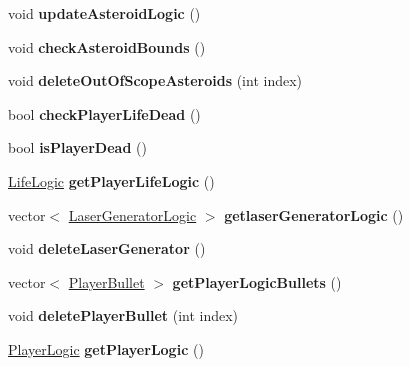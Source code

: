 \begin{DoxyCompactItemize}
void {\bfseries update\+Asteroid\+Logic} ()
\item 
\mbox{\label{class_game_logic_a35dcb163c584e620b876def784cbd7a4}} 
void {\bfseries check\+Asteroid\+Bounds} ()
\item 
\mbox{\label{class_game_logic_ae2bb92c22bea679a7467c592f253263b}} 
void {\bfseries delete\+Out\+Of\+Scope\+Asteroids} (int index)
\item 
\mbox{\label{class_game_logic_a612e0df42ffe7ab590ce5a87c94aa6c9}} 
bool {\bfseries check\+Player\+Life\+Dead} ()
\item 
\mbox{\label{class_game_logic_a743d03f2c6dab3786addba9b2bc1e5dc}} 
bool {\bfseries is\+Player\+Dead} ()
\item 
\mbox{\label{class_game_logic_ad30541663e6b28e997646173fbdf344e}} 
\hyperlink{class_life_logic}{Life\+Logic} {\bfseries get\+Player\+Life\+Logic} ()
\item 
\mbox{\label{class_game_logic_abe0e031ff3278ebb3c049b06f458e5b4}} 
vector$<$ \hyperlink{class_laser_generator_logic}{Laser\+Generator\+Logic} $>$ {\bfseries getlaser\+Generator\+Logic} ()
\item 
\mbox{\label{class_game_logic_adc970904cd9d94e6e64b733863839ddf}} 
void {\bfseries delete\+Laser\+Generator} ()
\item 
\mbox{\label{class_game_logic_a52d34b124f0bf66dee3a144e4645e60c}} 
vector$<$ \hyperlink{class_player_bullet}{Player\+Bullet} $>$ {\bfseries get\+Player\+Logic\+Bullets} ()
\item 
\mbox{\label{class_game_logic_ae5629e5f0bf316435c6b4f40171755b9}} 
void {\bfseries delete\+Player\+Bullet} (int index)
\item 
\mbox{\label{class_game_logic_a7aeb038bd7a0feef3377745ae334011c}} 
\hyperlink{class_player_logic}{Player\+Logic} {\bfseries get\+Player\+Logic} ()
\item 
\mbox{\label{class_game_logic_afa1fd0270df0970723f3aef06431e2d8}} 

\end{DoxyCompactItemize}
